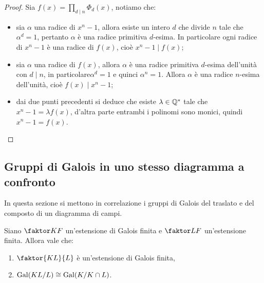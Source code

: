 \documentclass[11pt]{scrartcl}
\begin{document}
	\begin{proof}
		Sia $f(x) = \displaystyle\prod_{d \mid n}\Phi_d(x)$, notiamo che:
		\begin{itemize}
			\item sia $\alpha$ una radice di $x^n - 1$, allora esiste un intero $d$
			che divide $n$ tale che $\alpha^d = 1$, pertanto $\alpha$ è una radice primitiva
			$d$-esima. In particolare ogni radice di $x^n - 1$ è una radice di 
			$f(x)$, cioè $x^n - 1 \mid f(x)$;
			\item sia $\alpha$ una radice di $f(x)$, allora $\alpha$ è una radice
			primitiva $d$-esima dell'unità con $d\mid n$, in particolare$\alpha^d = 1$
			e quinci $\alpha^n = 1$. Allora $\alpha$ è una radice $n$-esima dell'unità,
			cioè $f(x) \mid x^n - 1$;
			\item dai due punti precedenti si deduce che esiste $\lambda \in \mathbb Q^*$
			tale che $x^n - 1 = \lambda f(x)$, d'altra parte entrambi i polinomi
			sono monici, quindi $x^n - 1 = f(x)$.
		\end{itemize}
	\end{proof}
	
	\newpage
	
	\subsection{Gruppi di Galois in uno stesso diagramma a confronto}
	
	In questa sezione si mettono in correlazione i gruppi di Galois del traslato
	e del composto di un diagramma di campi.
	
	\begin{proposition}
		\label{prop3.13}
		Siano $\faktor K F$ un'estensione di Galois finita e $\faktor L F$ un'estensione
		finita. Allora vale che:
		\begin{enumerate}[(1)]
			\item $\faktor{KL}{L}$ è un'estensione di Galois finita,
			\item $\operatorname{Gal}(KL/L) \cong \operatorname{Gal}(K/K\cap L)$.
		\end{enumerate}
	\end{proposition}
	
\end{document}
